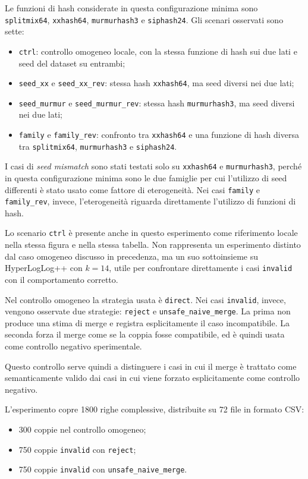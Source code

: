   Le funzioni di hash considerate in questa configurazione minima sono
  \texttt{splitmix64}, \texttt{xxhash64}, \texttt{murmurhash3} e
  \texttt{siphash24}. Gli scenari osservati sono sette:
  \begin{itemize}
      \item \texttt{ctrl}: controllo omogeneo locale, con la stessa funzione di
      hash sui due lati e seed del dataset su entrambi;
      \item \texttt{seed\_xx} e \texttt{seed\_xx\_rev}: stessa hash
      \texttt{xxhash64}, ma seed diversi nei due lati;
      \item \texttt{seed\_murmur} e \texttt{seed\_murmur\_rev}: stessa hash
      \texttt{murmurhash3}, ma seed diversi nei due lati;
      \item \texttt{family} e \texttt{family\_rev}: confronto tra
      \texttt{xxhash64} e una funzione di hash diversa tra
      \texttt{splitmix64}, \texttt{murmurhash3} e \texttt{siphash24}.
  \end{itemize}

  I casi di \emph{seed mismatch} sono stati testati solo su
  \texttt{xxhash64} e \texttt{murmurhash3}, perché in questa configurazione minima sono
  le due famiglie per cui l'utilizzo di seed differenti è stato usato come fattore
  di eterogeneità. Nei casi \texttt{family} e \texttt{family\_rev}, invece,
  l'eterogeneità riguarda direttamente l'utilizzo di funzioni di hash.

  Lo scenario \texttt{ctrl} è presente anche in questo esperimento come
  riferimento locale nella stessa figura e nella stessa tabella. Non rappresenta
  un esperimento distinto dal caso omogeneo discusso in precedenza, ma un suo
  sottoinsieme su HyperLogLog++ con \(k=14\), utile per confrontare direttamente
  i casi \texttt{invalid} con il comportamento corretto.

  Nel controllo omogeneo la strategia usata è \texttt{direct}. Nei casi
  \texttt{invalid}, invece, vengono osservate due strategie:
  \texttt{reject} e \texttt{unsafe\_naive\_merge}. La prima non produce una stima
  di merge e registra esplicitamente il caso incompatibile. La seconda forza il
  merge come se la coppia fosse compatibile, ed è quindi usata come controllo
  negativo sperimentale.

   Questo controllo serve quindi a distinguere i casi in cui il merge è trattato
  come semanticamente valido dai casi in cui viene forzato esplicitamente come
  controllo negativo.

  L'esperimento copre 1800 righe complessive, distribuite su 72 file in formato
  CSV:
  \begin{itemize}
      \item 300 coppie nel controllo omogeneo;
      \item 750 coppie \texttt{invalid} con \texttt{reject};
      \item 750 coppie \texttt{invalid} con \texttt{unsafe\_naive\_merge}.
  \end{itemize}


